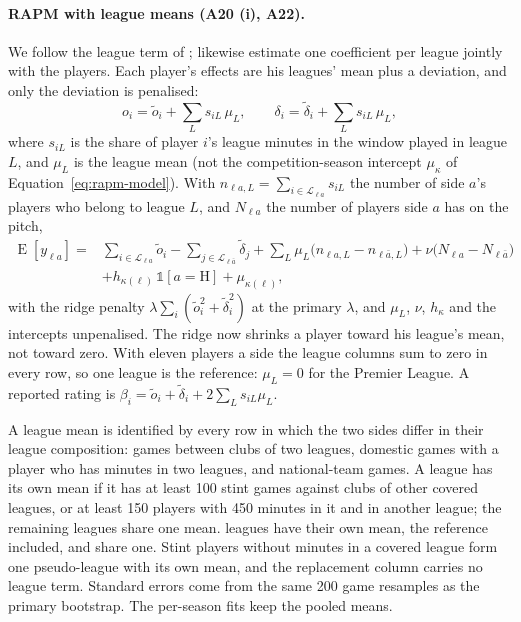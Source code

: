 \documentclass[11pt,a4paper]{article}
\DeclareMathOperator{\E}{E}
\begin{document}
\paragraph{RAPM with league means (A20 (i), A22).}
We follow the league term of \citet{pantuso2021transfer};
\citet{kharrat2020plusminus} likewise estimate one coefficient per league
jointly with the players. Each player's effects are his leagues' mean plus a
deviation, and only the deviation is penalised:
\begin{equation}
  o_i = \tilde o_i + \sum_L s_{iL}\, \mu_L, \qquad
  \delta_i = \tilde\delta_i + \sum_L s_{iL}\, \mu_L ,
  \label{eq:league-effects}
\end{equation}
where $s_{iL}$ is the share of player $i$'s league minutes in the window played
in league $L$, and $\mu_L$ is the league mean (not the competition-season
intercept $\mu_\kappa$ of Equation~\eqref{eq:rapm-model}). With
$n_{\ell a, L} = \sum_{i \in \mathcal L_{\ell a}} s_{iL}$ the number of side $a$'s
players who belong to league $L$, and $N_{\ell a}$ the number of players side
$a$ has on the pitch,
\begin{equation}
\begin{aligned}
  \E[y_{\ell a}] ={}& \sum_{i \in \mathcal L_{\ell a}} \tilde o_i
    - \sum_{j \in \mathcal L_{\ell \bar a}} \tilde\delta_j
    + \sum_L \mu_L \big(n_{\ell a, L} - n_{\ell \bar a, L}\big)
    + \nu \big(N_{\ell a} - N_{\ell \bar a}\big) \\
    &+ h_{\kappa(\ell)}\, \mathbb 1[a = \mathrm H] + \mu_{\kappa(\ell)} ,
\end{aligned}
\label{eq:league-rapm}
\end{equation}
with the ridge penalty $\lambda \sum_i (\tilde o_i^2 + \tilde\delta_i^2)$ at the
primary $\lambda$, and $\mu_L$, $\nu$, $h_\kappa$ and the intercepts unpenalised.
The ridge now shrinks a player toward his league's mean, not toward zero. With
eleven players a side the league columns sum to zero in every row, so one
league is the reference: $\mu_L = 0$ for the Premier League. A reported rating
is $\beta_i = \tilde o_i + \tilde\delta_i + 2 \sum_L s_{iL} \mu_L$.

A league mean is identified by every row in which the two sides differ in
their league composition: games between clubs of two leagues, domestic games
with a player who has minutes in two leagues, and national-team games. A
league has its own mean if it has at least 100 stint games against clubs of
other covered leagues, or at least 150 players with 450 minutes in it and in
another league; the remaining leagues share one mean. \NLeaguesOwnMean{}
leagues have their own mean, the reference included, and \NLeaguesRest{} share
one. Stint players without minutes in a covered league form one pseudo-league
with its own mean, and the replacement column carries no league term. Standard
errors come from the same 200 game resamples as the primary bootstrap. The
per-season fits keep the pooled means.
\end{document}
